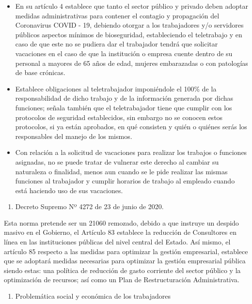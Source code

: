\documentclass[a4paper, nobind]{templates/ociamthesis}
\providecommand{\tightlist}{%
  \setlength{\itemsep}{0pt}\setlength{\parskip}{0pt}}
\begin{document}
\begin{itemize}
\item
  En su artículo 4 establece que tanto el sector público y privado deben adoptar medidas administrativas para contener el contagio y propagación del Coronavirus COVID - 19, debiendo otorgar a los trabajadores y/o servidores públicos aspectos mínimos de bioseguridad, estableciendo el teletrabajo y en caso de que este no se pudiera dar el trabajador tendrá que solicitar vacaciones en el caso de que la institución o empresa cuente dentro de su personal a mayores de 65 años de edad, mujeres embarazadas o con patologías de base crónicas.
\item
  Establece obligaciones al teletrabajador imponiéndole el 100\% de la responsabilidad de dicho trabajo y de la información generada por dichas funciones; señala también que el teletrabajador tiene que cumplir con los protocolos de seguridad establecidos, sin embargo no se conocen estos protocolos, si ya están aprobados, en qué consisten y quién o quiénes serás los responsables del manejo de los mismos.
\item
  Con relación a la solicitud de vacaciones para realizar los trabajos o funciones asignadas, no se puede tratar de vulnerar este derecho al cambiar su naturaleza o finalidad, menos aun cuando se le pide realizar las mismas funciones al trabajador y cumplir horarios de trabajo al empleado cuando está haciendo uso de sus vacaciones.
\end{itemize}

\begin{enumerate}
\def\labelenumi{\arabic{enumi}.}
\setcounter{enumi}{2}
\tightlist
\item
  Decreto Supremo Nº 4272 de 23 de junio de 2020.
\end{enumerate}

Esta norma pretende ser un 21060 remozado, debido a que instruye un despido masivo en el Gobierno, el Artículo 83 establece la reducción de Consultores en línea en las instituciones públicas del nivel central del Estado. Así mismo, el artículo 85 respecto a las medidas para optimizar la gestión empresarial, establece que se adoptará medidas necesarias para optimizar la gestión empresarial pública siendo estas: una política de reducción de gasto corriente del sector público y la optimización de recursos; así como un Plan de Restructuración Administrativa.

\begin{enumerate}
\def\labelenumi{\arabic{enumi}.}
\setcounter{enumi}{3}
\tightlist
\item
  Problemática social y económica de los trabajadores
\end{enumerate}
\end{document}
